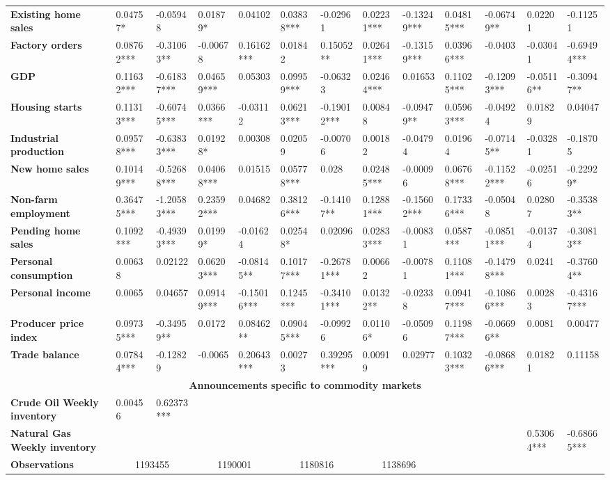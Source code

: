 \begin{sidewaystable}
{\begin{tabular}{@{}lllllllllllll@{}}
\textbf{Existing home sales}& 0.04757* & -0.05948 & 0.01879* & 0.04102 & 0.03838*** & -0.02961 & 0.02231*** & -0.13249*** & 0.04815*** & -0.06749** & 0.02201 & -0.11251 \\ \textbf{Factory orders}& 0.08762*** & -0.31063** & -0.00678 & 0.16162*** & 0.01842 & 0.15052** & 0.02641*** & -0.13159*** & 0.03966*** & -0.0403 & -0.03041 & -0.69494*** \\ \textbf{GDP}& 0.11632*** & -0.61837*** & 0.04659*** & 0.05303 & 0.09959*** & -0.06323 & 0.02464*** & 0.01653 & 0.11025*** & -0.12093*** & -0.05116** & -0.30947** \\ \textbf{Housing starts}& 0.11313*** & -0.60745*** & 0.0366*** & -0.03112 & 0.06213*** & -0.19012*** & 0.00848 & -0.09479** & 0.05963*** & -0.04924 & 0.01829 & 0.04047 \\ \textbf{Industrial production}& 0.09578*** & -0.63833*** & 0.01928* & 0.00308 & 0.02059 & -0.00706 & 0.00182 & -0.04794 & 0.01964 & -0.07145** & -0.03281 & -0.18705 \\ \textbf{New home sales}& 0.10149*** & -0.52688*** & 0.04068*** & 0.01515 & 0.05778*** & 0.028 & 0.02485*** & -0.00096 & 0.06768*** & -0.11522*** & -0.02516 & -0.22929* \\ \textbf{Non-farm employment}& 0.36475*** & -1.20583*** & 0.23592*** & 0.04682 & 0.38126*** & -0.14107** & 0.12881*** & -0.15602*** & 0.17336*** & -0.05048 & 0.02807 & -0.35383** \\ \textbf{Pending home sales}& 0.1092*** & -0.49393*** & 0.01999* & -0.01624 & 0.02548* & 0.02096 & 0.02833*** & -0.00831 & 0.0587*** & -0.08511*** & -0.01374 & -0.30813** \\ \textbf{Personal consumption}& 0.00638 & 0.02122 & 0.06203*** & -0.08145** & 0.10177*** & -0.26781*** & 0.00662 & -0.00781 & 0.11081*** & -0.14798*** & 0.0241 & -0.37604** \\ \textbf{Personal income}& 0.0065 & 0.04657 & 0.09149*** & -0.15016*** & 0.1245*** & -0.34101*** & 0.01322** & -0.02338 & 0.09417*** & -0.10866*** & 0.00283 & -0.43167*** \\ \textbf{Producer price index}& 0.09735*** & -0.34959** & 0.0172 & 0.08462** & 0.09045*** & -0.09926 & 0.01106* & -0.05096 & 0.11987*** & -0.06696** & 0.0081 & 0.00477 \\ \textbf{Trade balance}& 0.07844*** & -0.12829 & -0.0065 & 0.20643*** & 0.00273 & 0.39295*** & 0.00919 & 0.02977 & 0.10323*** & -0.08686*** & 0.01821 & 0.11158 \\  \midrule \multicolumn{13}{c}{\textbf{Announcements specific to commodity markets}} \\ \midrule \textbf{Crude Oil Weekly inventory}& 0.00456 & 0.62373*** &  &  &  &  &  &  &  &  &  &  \\ \textbf{Natural Gas Weekly inventory}&  &  &  &  &  &  &  &  &  &  & 0.53064*** & -0.68665*** \\  \midrule \textbf{Observations}             &\multicolumn{2}{c}{ 1193455 }                                                 & \multicolumn{2}{c}{ 1190001 }                                                 & \multicolumn{2}{c}{ 1180816 }                                                 & \multicolumn{2}{c}{ 1138696 }                 
\end{tabular}}
\end{sidewaystable}
